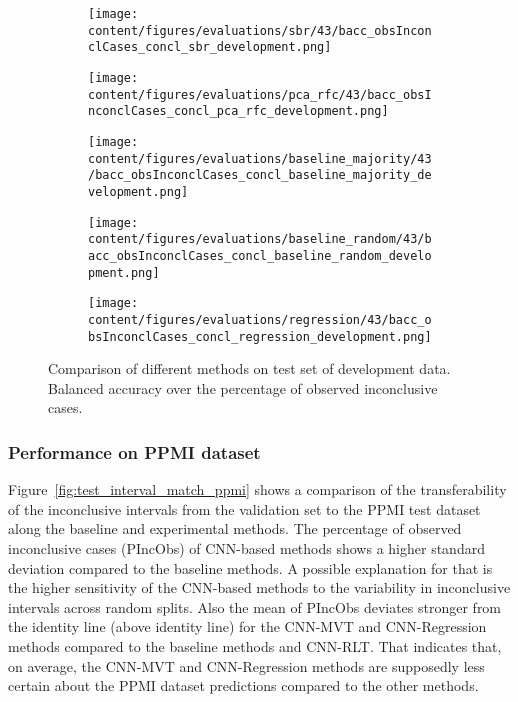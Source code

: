 \begin{figure}[ht]
  \begin{subfigure}{0.5\textwidth}
    \centering
    \texttt{[image: content/figures/evaluations/sbr/43/bacc\_obsInconclCases\_concl\_sbr\_development.png]}
  \end{subfigure}
  \hfill
  \begin{subfigure}{0.5\textwidth}
    \centering
    \texttt{[image: content/figures/evaluations/pca\_rfc/43/bacc\_obsInconclCases\_concl\_pca\_rfc\_development.png]}
  \end{subfigure}
  \hfill
  \begin{subfigure}{0.5\textwidth}
    \centering
    \texttt{[image: content/figures/evaluations/baseline\_majority/43/bacc\_obsInconclCases\_concl\_baseline\_majority\_development.png]}
  \end{subfigure}
  \hfill
  \begin{subfigure}{0.5\textwidth}
    \centering
    \texttt{[image: content/figures/evaluations/baseline\_random/43/bacc\_obsInconclCases\_concl\_baseline\_random\_development.png]}
  \end{subfigure}
  \hfill
  \begin{subfigure}{0.5\textwidth}
    \centering
    \texttt{[image: content/figures/evaluations/regression/43/bacc\_obsInconclCases\_concl\_regression\_development.png]}
  \end{subfigure}

  \caption{Comparison of different methods on test set of development data. 
  Balanced accuracy over the percentage of observed inconclusive cases.}
  \label{fig:test_dev}
\end{figure}



\subsubsection{Performance on PPMI dataset}


Figure~\ref{fig:test_interval_match_ppmi} shows a comparison of the transferability of the inconclusive intervals 
from the validation set to the PPMI test dataset along the baseline and experimental methods.
The percentage of observed inconclusive cases (PIncObs) of CNN-based methods shows a higher standard deviation 
compared to the baseline methods.
A possible explanation for that is the higher sensitivity of the CNN-based methods 
to the variability in inconclusive intervals across random splits.
Also the mean of PIncObs deviates stronger from the identity line (above identity line) 
for the CNN-MVT and CNN-Regression methods compared to the baseline methods and CNN-RLT.
That indicates that, on average, the CNN-MVT and CNN-Regression methods are supposedly less certain 
about the PPMI dataset predictions compared to the other methods.

